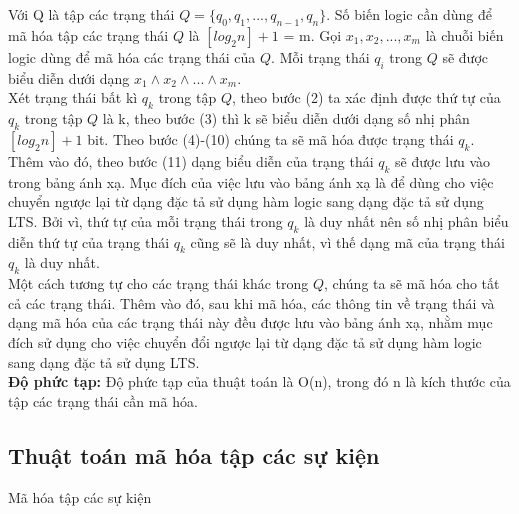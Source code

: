 \documentclass[a4paper,13pt,oneside,openany]{book}
\newenvironment{megaalgorithm}[1][htb]
{\renewcommand{\algorithmcfname}{Thuật toán}%
	\begin{algorithm}[#1]%
}{\end{algorithm}}
\begin{document}
\begin{flushleft}
		Với Q là tập các trạng thái $Q = \{q_0, q_1, ..., q_{n-1}, q_n\}$. Số biến logic cần dùng để mã hóa tập các trạng thái $Q$ là $[log_{2}n] + 1$ = m. Gọi $x_{1}, x_{2}, ..., x_{m}$ là chuỗi biến logic dùng để mã hóa các trạng thái của $Q$. Mỗi trạng thái $q_i$ trong $Q$ sẽ được biểu diễn dưới dạng $x_{1}\land x_{2}\land...\land x_{m}$.\\
		Xét trạng thái bất kì $q_k$ trong tập $Q$, theo bước (2) ta xác định được thứ tự của $q_k$ trong tập $Q$ là k, theo bước (3) thì k sẽ biểu diễn dưới dạng số nhị phân $[log_{2}n] + 1$ bit. Theo bước (4)-(10) chúng ta sẽ mã hóa được trạng thái $q_k$. Thêm vào đó, theo bước (11) dạng biểu diễn của trạng thái $q_k$ sẽ được lưu vào trong bảng ánh xạ. Mục đích của việc lưu vào bảng ánh xạ là để dùng cho việc chuyển ngược lại từ dạng đặc tả sử dụng hàm logic sang dạng đặc tả sử dụng LTS. Bởi vì, thứ tự của mỗi trạng thái trong $q_k$ là duy nhất nên số nhị phân biểu diễn thứ tự của trạng thái $q_k$ cũng sẽ là duy nhất, vì thế dạng mã của trạng thái $q_k$ là duy nhất.\\
		Một cách tương tự cho các trạng thái khác trong $Q$, chúng ta sẽ mã hóa cho tất cả các trạng thái. Thêm vào đó, sau khi mã hóa, các thông tin về trạng thái và dạng mã hóa của các trạng thái này đều được lưu vào bảng ánh xạ, nhằm mục đích sử dụng cho việc chuyển đổi ngược lại từ dạng đặc tả sử dụng hàm logic sang dạng đặc tả sử dụng LTS.\\
		\textbf{Độ phức tạp:} Độ phức tạp của thuật toán là O(n), trong đó n là kích thước của tập các trạng thái cần mã hóa.\\	
		
		\subsection{Thuật toán mã hóa tập các sự kiện}
		\begin{megaalgorithm}[H]
			\SetAlgoLined
			\DontPrintSemicolon
				
			\caption{Mã hóa tập các sự kiện}
		\end{megaalgorithm}
		

\end{flushleft}
\end{document}
